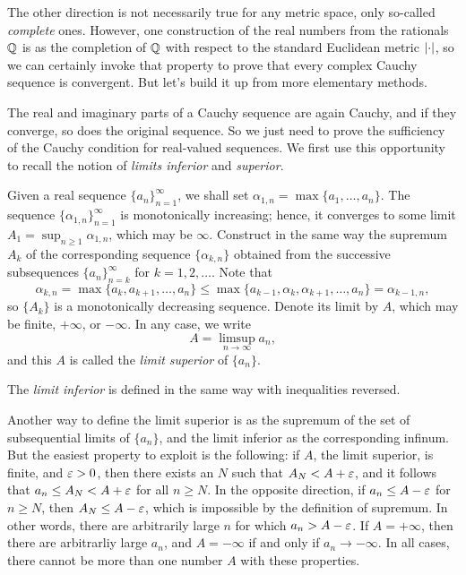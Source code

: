 The other direction is not necessarily true for any metric space, only so-called \textit{complete} ones. However, one construction of the real numbers from the rationals $\mathbb Q$ is as the completion of $\mathbb Q$ with respect to the standard Euclidean metric $\lvert \cdot \rvert$, so we can certainly invoke that property to prove that every complex Cauchy sequence is convergent. But let's build it up from more elementary methods.

The real and imaginary parts of a Cauchy sequence are again Cauchy, and if they converge, so does the original sequence. So we just need to prove the sufficiency of the Cauchy condition for real-valued sequences. We first use this opportunity to recall the notion of \emph{limits inferior} and \emph{superior}.

\begin{definition}
	Given a real sequence $\{a_n\}_{n=1}^{\infty}$, we shall set $\alpha_{1,n}=\max\{a_1,\dots,a_n\}$. The sequence $\{\alpha_{1,n}\}_{n=1}^{\infty}$ is monotonically increasing; hence, it converges to some limit $A_1=\sup_{n \ge 1}\alpha_{1,n}$, which may be $\infty$. Construct in the same way the supremum $A_k$ of the corresponding sequence $\{\alpha_{k,n}\}$ obtained from the successive subsequences $\{a_n\}_{n=k}^{\infty}$ for $k=1,2,\dots$. Note that $$\alpha_{k,n}=\max\{a_k,a_{k+1},\dots,a_n\} \le \max\{a_{k-1},\alpha_k,\alpha_{k+1},\dots,a_n\}=\alpha_{k-1,n},$$ so $\{A_k\}$ is a monotonically decreasing sequence. Denote its limit by $A$, which may be finite, $+\infty$, or $-\infty$. In any case, we write $$A=\limsup_{n \rightarrow \infty} a_n,$$ and this $A$ is called the \emph{limit superior} of $\{a_n\}$.
	
	The \emph{limit inferior} is defined in the same way with inequalities reversed.
\end{definition}

Another way to define the limit superior is as the supremum of the set of subsequential limits of $\{a_n\}$, and the limit inferior as the corresponding infinum. But the easiest property to exploit is the following: if $A$, the limit superior, is finite, and $\varepsilon>0$, then there exists an $N$ such that $A_N<A+\varepsilon$, and it follows that $a_n \le A_N<A+\varepsilon$ for all $n \ge N$. In the opposite direction, if $a_n \le A-\varepsilon$ for $n \ge N$, then $A_N \le A-\varepsilon$, which is impossible by the definition of supremum. In other words, there are arbitrarily large $n$ for which $a_n>A-\varepsilon$. If $A=+\infty$, then there are arbitrarliy large $a_n$, and $A=-\infty$ if and only if $a_n \rightarrow -\infty$. In all cases, there cannot be more than one number $A$ with these properties.

